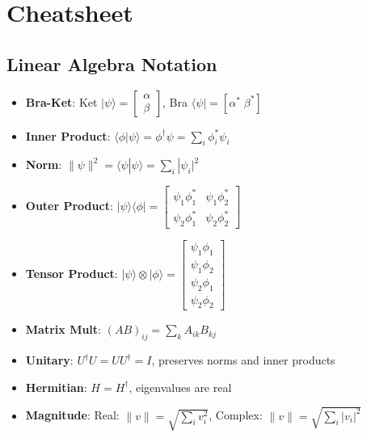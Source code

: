 \section{Cheatsheet}\label{sec:cheatsheet}
\begingroup
\setlength{\parindent}{0pt}
\setlength{\parskip}{0pt plus 0.5ex}
\raggedright
\footnotesize

\makeatother

\begin{multicols}{3}

\section*{Linear Algebra Notation}
\begin{itemize}[leftmargin=*,nosep,topsep=0pt]
    \item \textbf{Bra-Ket}: Ket $|\psi\rangle = \begin{bmatrix} \alpha \\ \beta \end{bmatrix}$, Bra $\langle\psi| = [\alpha^* \; \beta^*]$
    \item \textbf{Inner Product}: $\langle\phi|\psi\rangle = \phi^\dagger\psi = \sum_i \phi_i^*\psi_i$
    \item \textbf{Norm}: $\|\psi\|^2 = \langle\psi|\psi\rangle = \sum_i |\psi_i|^2$
    \item \textbf{Outer Product}: $|\psi\rangle\langle\phi| = \begin{bmatrix} \psi_1\phi_1^* & \psi_1\phi_2^* \\ \psi_2\phi_1^* & \psi_2\phi_2^* \end{bmatrix}$
    \item \textbf{Tensor Product}: $|\psi\rangle \otimes |\phi\rangle = \begin{bmatrix} \psi_1\phi_1 \\ \psi_1\phi_2 \\ \psi_2\phi_1 \\ \psi_2\phi_2 \end{bmatrix}$
    \item \textbf{Matrix Mult}: $(AB)_{ij} = \sum_k A_{ik}B_{kj}$
    \item \textbf{Unitary}: $U^\dagger U = UU^\dagger = I$, preserves norms and inner products
    \item \textbf{Hermitian}: $H = H^\dagger$, eigenvalues are real
    \item \textbf{Magnitude}: Real: $\|v\| = \sqrt{\sum_i v_i^2}$, Complex: $\|v\| = \sqrt{\sum_i |v_i|^2}$
\end{itemize}


\end{multicols}

